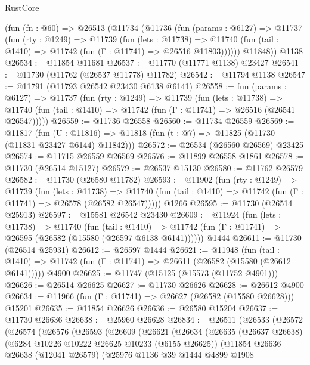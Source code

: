 \begin{lexlean}{RustCore}
\begin{coremodule}
    (fun (fn : @60) =>
    @26513
      (@11734
        (@11736
          (fun (params : @6127) =>
          @11737
            (fun (rty : @1249) =>
            @11739
              (fun (lets : @11738) =>
              @11740 (fun (tail : @1410) => @11742 (fun (Γ : @11741) => @26516 @11803))))))
        @11848))
    @1138
@26534 := @11854 @11681
@26537 := @11770 (@11771 @1138) @23427
@26541 := @11730 (@11762 (@26537 @11778) @11782)
@26542 := @11794 @1138
@26547 := @11791 (@11793 @26542 @23430 @6138 @6141)
@26558 := fun (params : @6127) =>
  @11737
    (fun (rty : @1249) =>
    @11739
      (fun (lets : @11738) =>
      @11740 (fun (tail : @1410) => @11742 (fun (Γ : @11741) => @26516 (@26541 @26547)))))
@26559 := @11736 @26558
@26560 := @11734 @26559
@26569 := @11817
    (fun (U : @11816) => @11818 (fun (t : @7) => @11825 (@11730 (@11831 @23427 @6144) @11842)))
@26572 := @26534 (@26560 @26569) @23425
@26574 := @11715 @26559 @26569
@26576 := @11899 @26558 @1861
@26578 := @11730 (@26514 @15127)
@26579 := @26537 @15130
@26580 := @11762 @26579
@26582 := @11730 (@26580 @11782)
@26593 := @11902
    (fun (rty : @1249) =>
    @11739
      (fun (lets : @11738) =>
      @11740 (fun (tail : @1410) => @11742 (fun (Γ : @11741) => @26578 (@26582 @26547)))))
    @1266
@26595 := @11730 (@26514 @25913)
@26597 := @15581 @26542 @23430
@26609 := @11924
    (fun (lets : @11738) =>
    @11740
      (fun (tail : @1410) =>
      @11742 (fun (Γ : @11741) => @26595 (@26582 (@15580 (@26597 @6138 @6141))))))
    @1444
@26611 := @11730 (@26514 @25931)
@26612 := @26597 @1444
@26621 := @11948
    (fun (tail : @1410) => @11742 (fun (Γ : @11741) => @26611 (@26582 (@15580 (@26612 @6141)))))
    @4900
@26625 := @11747 (@15125 (@15573 (@11752 @4901)))
@26626 := @26514 @26625
@26627 := @11730 @26626
@26628 := @26612 @4900
@26634 := @11966 (fun (Γ : @11741) => @26627 (@26582 (@15580 @26628))) @15201
@26635 := @11854 @26626
@26636 := @26580 @15204
@26637 := @11730 @26636
@26638 := @25960 @26628
@26834 := @26511
    (@26533
      (@26572
        (@26574
          (@26576
            (@26593
              (@26609
                (@26621
                  (@26634
                    (@26635
                      (@26637 @26638)
                      (@6284 @10226 @10222 @26625 @10233 (@6155 @26625))
                      (@11854
                        @26636
                        @26638
                        (@12041 @26579)
                        (@25976
                          @1136
                          @39
                          @1444
                          @4899
                          @1908

\end{coremodule}
\end{lexlean}
